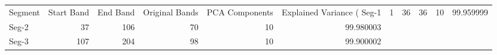 \begin{tabular}{lrrrrr}
\toprule
Segment & Start Band & End Band & Original Bands & PCA Components & Explained Variance (%
\midrule
Seg-1 & 1 & 36 & 36 & 10 & 99.959999 \\
Seg-2 & 37 & 106 & 70 & 10 & 99.980003 \\
Seg-3 & 107 & 204 & 98 & 10 & 99.900002 \\
\bottomrule
\end{tabular}
